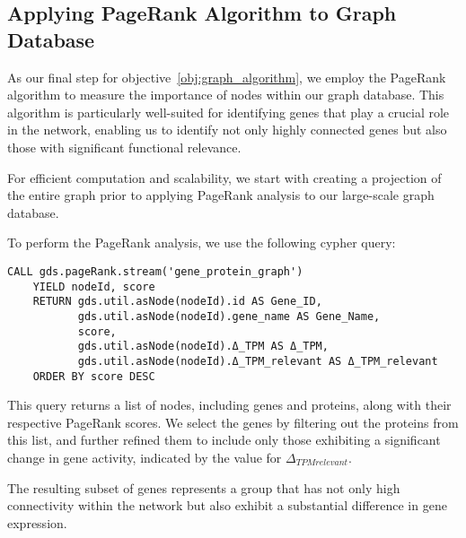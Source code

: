 \subsection{Applying PageRank Algorithm to Graph Database} \label{subsec:graph_database_algo}

As our final step for objective~\ref{obj:graph_algorithm},
we employ the PageRank algorithm to measure the importance of nodes within our graph database.
This algorithm is particularly well-suited for identifying genes that play a crucial role in the network,
enabling us to identify not only highly connected genes but also those with significant functional relevance.

For efficient computation and scalability,
we start with creating a projection of the entire graph prior to applying PageRank analysis to our large-scale graph database.

To perform the PageRank analysis, we use the following cypher query:
\begin{lstlisting}[language=Cypher, label={lst:pagerank}]
    CALL gds.pageRank.stream('gene_protein_graph')
    YIELD nodeId, score
    RETURN gds.util.asNode(nodeId).id AS Gene_ID,
           gds.util.asNode(nodeId).gene_name AS Gene_Name,
           score,
           gds.util.asNode(nodeId).Δ_TPM AS Δ_TPM,
           gds.util.asNode(nodeId).Δ_TPM_relevant AS Δ_TPM_relevant
    ORDER BY score DESC
\end{lstlisting}

This query returns a list of nodes, including genes and proteins, along with their respective PageRank scores.
We select the genes by filtering out the proteins from this list, and
further refined them to include only those exhibiting a significant change in gene activity,
indicated by the value for $\Delta_{TPM relevant}$.

The resulting subset of genes represents a group that has not only high connectivity
within the network but also exhibit a substantial difference in gene expression.\\
